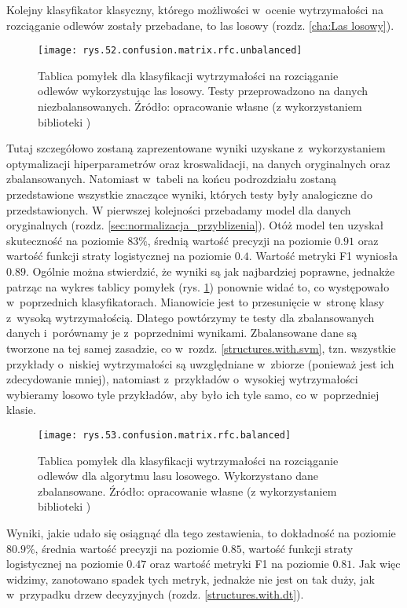 Kolejny klasyfikator klasyczny, którego możliwości w~ocenie wytrzymałości na rozciąganie odlewów zostały przebadane, to las losowy (rozdz. \ref{cha:Las losowy}). 
\begin{figure}[!h]
    \centering
    \texttt{[image: rys.52.confusion.matrix.rfc.unbalanced]}
    \caption{Tablica pomyłek dla klasyfikacji wytrzymałości na rozciąganie odlewów wykorzystując las losowy. Testy przeprowadzono na danych niezbalansowanych. Źródło: opracowanie własne (z wykorzystaniem biblioteki )}
    \label{rys.52.confusion.matrix.rfc.unbalanced}
\end{figure}
Tutaj szczegółowo zostaną zaprezentowane wyniki uzyskane z~wykorzystaniem optymalizacji hiperparametrów oraz kroswalidacji, na danych oryginalnych oraz zbalansowanych. Natomiast w~tabeli na końcu podrozdziału zostaną przedstawione wszystkie znaczące wyniki, których testy były analogiczne do przedstawionych. 
W pierwszej kolejności przebadamy model dla danych oryginalnych (rozdz. \ref{sec:normalizacja_przyblizenia}). Otóż model ten uzyskał skuteczność na poziomie $83\%$, średnią wartość precyzji na poziomie $0.91$ oraz wartość funkcji straty logistycznej na poziomie $0.4$. Wartość metryki F1 wyniosła $0.89$. Ogólnie można stwierdzić, że wyniki są jak najbardziej poprawne, jednakże patrząc na wykres tablicy pomyłek (rys. \ref{rys.52.confusion.matrix.rfc.unbalanced}) ponownie widać to, co występowało w~poprzednich klasyfikatorach. Mianowicie jest to przesunięcie w~stronę klasy z~wysoką wytrzymałością. Dlatego powtórzymy te testy dla zbalansowanych danych i~porównamy je z~poprzednimi wynikami. 
Zbalansowane dane są tworzone na tej samej zasadzie, co w~rozdz. \ref{structures.with.svm}, tzn. wszystkie przykłady o~niskiej wytrzymałości są uwzględniane w~zbiorze (ponieważ jest ich zdecydowanie mniej), natomiast z~przykładów o~wysokiej wytrzymałości wybieramy losowo tyle przykładów, aby było ich tyle samo, co w~poprzedniej klasie. 
\begin{figure}[h]
    \centering
    \texttt{[image: rys.53.confusion.matrix.rfc.balanced]}
    \caption{Tablica pomyłek dla klasyfikacji wytrzymałości na rozciąganie odlewów dla algorytmu lasu losowego. Wykorzystano dane zbalansowane. Źródło: opracowanie własne (z wykorzystaniem biblioteki )}
    \label{rys.53.confusion.matrix.rfc.balanced}
\end{figure}
Wyniki, jakie udało się osiągnąć dla tego zestawienia, to dokładność na poziomie $80.9\%$, średnia wartość precyzji na poziomie $0.85$, wartość funkcji straty logistycznej na poziomie $0.47$ oraz wartość metryki F1 na poziomie $0.81$. Jak więc widzimy, zanotowano spadek tych metryk, jednakże nie jest on tak duży, jak w~przypadku drzew decyzyjnych (rozdz. \ref{structures.with.dt}). 
